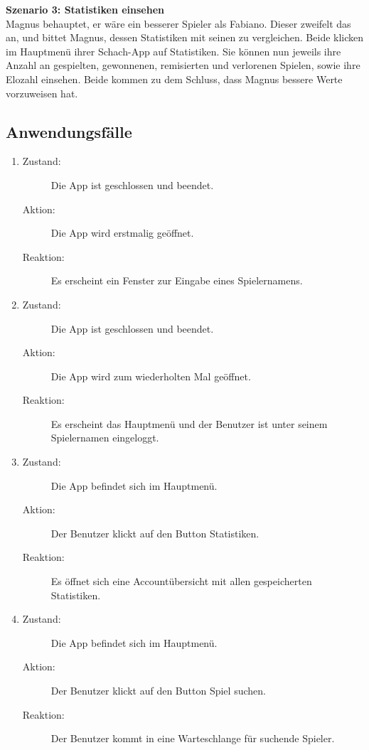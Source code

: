 \documentclass[parskip=full]{scrartcl}
\begin{document}
\textbf{Szenario 3: \glqq Statistiken einsehen\grqq} \\
Magnus behauptet, er wäre ein besserer Spieler als Fabiano. Dieser zweifelt das an, und bittet Magnus, dessen Statistiken mit seinen zu vergleichen. Beide klicken im Hauptmenü ihrer Schach-App auf \glqq Statistiken\grqq. Sie können nun jeweils ihre Anzahl an gespielten, gewonnenen, remisierten und verlorenen Spielen, sowie ihre \gls{Elo}zahl einsehen. Beide kommen zu dem Schluss, dass Magnus bessere Werte vorzuweisen hat.
\pagebreak
\subsection{Anwendungsfälle}
\begin{enumerate}
 
    \item
	\begin{description}
	\item[Zustand:] Die App ist geschlossen und beendet.
	\item[Aktion:] Die App wird erstmalig geöffnet.
	\item[Reaktion:] Es erscheint ein Fenster zur Eingabe eines Spielernamens.  \\	
	\end{description}
	
	\item
	\begin{description}
	\item[Zustand:] Die App ist geschlossen und beendet.
	\item[Aktion:] Die App wird zum wiederholten Mal geöffnet.
	\item[Reaktion:] Es erscheint das Hauptmenü und der Benutzer ist unter seinem Spielernamen eingeloggt. \\
	\end{description}
	
	\item
	\begin{description}
	\item[Zustand:] Die App befindet sich im Hauptmenü.
	\item[Aktion:] Der Benutzer klickt auf den Button \glqq Statistiken\grqq.
	\item[Reaktion:] Es öffnet sich eine Accountübersicht mit allen gespeicherten Statistiken.  \\
	\end{description}
	
	\item
	\begin{description}
	\item[Zustand:] Die App befindet sich im Hauptmenü.
	\item[Aktion:] Der Benutzer klickt auf den Button \glqq Spiel suchen\grqq.
	\item[Reaktion:] Der Benutzer kommt in eine Warteschlange für suchende Spieler.  \\
	\end{description}
	

\end{enumerate}
\end{document}
